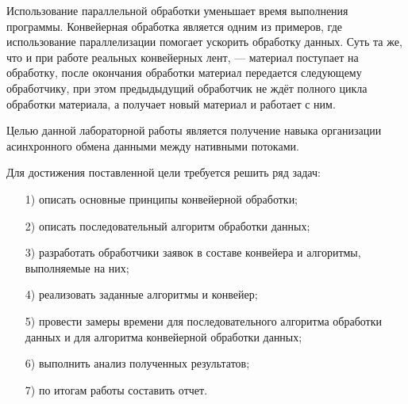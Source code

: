 

Использование параллельной обработки уменьшает время выполнения программы. Конвейерная обработка является одним из примеров, где использование параллелизации помогает ускорить обработку данных. Суть та же, что и при работе реальных конвейерных лент, ---
материал поступает на обработку, после окончания обработки материал передается следующему обработчику, при этом предыдыдущий
обработчик не ждёт полного цикла обработки материала, а получает новый
материал и работает с ним.

Целью данной лабораторной работы является получение навыка организации асинхронного обмена данными между нативными потоками.

Для достижения поставленной цели требуется решить ряд задач:
\begin{enumerate}[itemindent=1em]
	\item[1)] описать основные принципы конвейерной обработки;
	\item[2)] описать последовательный алгоритм обработки данных;
	\item[3)]
	разработать обработчики заявок в составе конвейера и алгоритмы, выполняемые на них;
	\item[4)] реализовать заданные алгоритмы и конвейер;
	\item[5)] провести замеры времени для последовательного алгоритма обработки данных и для алгоритма конвейерной обработки данных;%
 	\item[6)] выполнить анализ полученных результатов;
	\item[7)] по итогам работы составить отчет.
\end{enumerate}

\newpage
